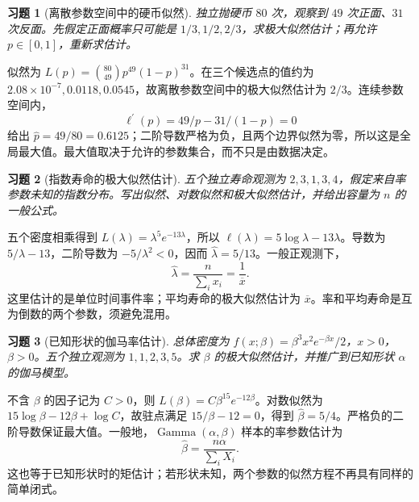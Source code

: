 \documentclass[UTF8,12pt,a4paper,fontset=fandol]{ctexart}
\newtheorem{exercise}{习题}[section]
\begin{document}
\begin{exercise}[离散参数空间中的硬币似然]\label{q:M-C10-1}
独立抛硬币 $80$ 次，观察到 $49$ 次正面、$31$ 次反面。先假定正面概率只可能是 $1/3,1/2,2/3$，求极大似然估计；再允许 $p\in[0,1]$，重新求估计。\par{}
\end{exercise}

\begin{solve}\label{a:M-C10-1}似然为 $L(p)=\binom{80}{49}p^{49}(1-p)^{31}$。在三个候选点的值约为 $2.08\times10^{-7},0.0118,0.0545$，故离散参数空间中的极大似然估计为 $2/3$。连续参数空间内，\[\ell^{\prime}(p)=49/p-31/(1-p)=0\]给出 $\widehat p=49/80=0.6125$；二阶导数严格为负，且两个边界似然为零，所以这是全局最大值。最大值取决于允许的参数集合，而不只是由数据决定。\end{solve}

\begin{exercise}[指数寿命的极大似然估计]\label{q:M-C10-2}
五个独立寿命观测为 $2,3,1,3,4$，假定来自率参数未知的指数分布。写出似然、对数似然和极大似然估计，并给出容量为 $n$ 的一般公式。\par{}
\end{exercise}

\begin{solve}\label{a:M-C10-2}五个密度相乘得到 $L(\lambda)=\lambda^5e^{-13\lambda}$，所以 $\ell(\lambda)=5\log\lambda-13\lambda$。导数为 $5/\lambda-13$，二阶导数为 $-5/\lambda^2<0$，因而 $\widehat\lambda=5/13$。一般正观测下，\[\widehat\lambda=\frac{n}{\sum_i x_i}=\frac1{\overline x}.\]这里估计的是单位时间事件率；平均寿命的极大似然估计为 $\overline x$。率和平均寿命是互为倒数的两个参数，须避免混用。\end{solve}

\begin{exercise}[已知形状的伽马率估计]\label{q:M-E2-II1}
总体密度为 $f(x;\beta)=\beta^3x^2e^{-\beta x}/2$，$x>0$，$\beta>0$。五个独立观测为 $1,1,2,3,5$。求 $\beta$ 的极大似然估计，并推广到已知形状 $\alpha$ 的伽马模型。\par{}
\end{exercise}

\begin{solve}\label{a:M-E2-II1}不含 $\beta$ 的因子记为 $C>0$，则 $L(\beta)=C\beta^{15}e^{-12\beta}$。对数似然为 $15\log\beta-12\beta+\log C$，故驻点满足 $15/\beta-12=0$，得到 $\widehat\beta=5/4$。严格负的二阶导数保证最大值。一般地，$\operatorname{Gamma}(\alpha,\beta)$ 样本的率参数估计为\[\widehat\beta=\frac{n\alpha}{\sum_iX_i}.\]这也等于已知形状时的矩估计；若形状未知，两个参数的似然方程不再具有同样的简单闭式。\end{solve}
\end{document}
